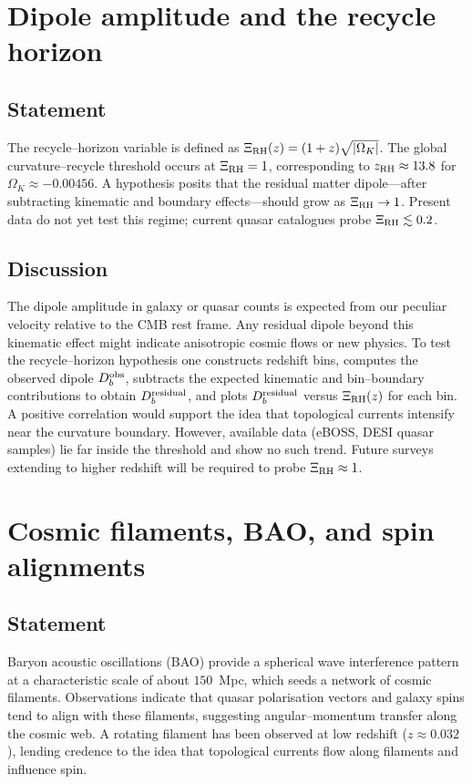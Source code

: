 \documentclass{article}
\begin{document}
\section{Dipole amplitude and the recycle horizon}
\label{sec:dipole}
\subsection{Statement}
The recycle–horizon variable is defined as $\Xi_{\rm RH}(z) = (1+z)\sqrt{|\Omega_K|}$.  The global curvature–recycle threshold occurs at $\Xi_{\rm RH}=1$, corresponding to $z_{\rm RH} \approx 13.8$ for $\Omega_K \approx -0.00456$.  A hypothesis posits that the residual matter dipole—after subtracting kinematic and boundary effects—should grow as $\Xi_{\rm RH} \to 1$.  Present data do not yet test this regime; current quasar catalogues probe $\Xi_{\rm RH} \lesssim 0.2$.

\subsection{Discussion}
The dipole amplitude in galaxy or quasar counts is expected from our peculiar velocity relative to the CMB rest frame.  Any residual dipole beyond this kinematic effect might indicate anisotropic cosmic flows or new physics.  To test the recycle–horizon hypothesis one constructs redshift bins, computes the observed dipole $D^{\rm obs}_b$, subtracts the expected kinematic and bin–boundary contributions to obtain $D^{\rm residual}_b$, and plots $D^{\rm residual}_b$ versus $\Xi_{\rm RH}(z)$ for each bin.  A positive correlation would support the idea that topological currents intensify near the curvature boundary.  However, available data (eBOSS, DESI quasar samples) lie far inside the threshold and show no such trend.  Future surveys extending to higher redshift will be required to probe $\Xi_{\rm RH}\approx1$.

\section{Cosmic filaments, BAO, and spin alignments}
\label{sec:filaments}
\subsection{Statement}
Baryon acoustic oscillations (BAO) provide a spherical wave interference pattern at a characteristic scale of about $150$~Mpc, which seeds a network of cosmic filaments.  Observations indicate that quasar polarisation vectors and galaxy spins tend to align with these filaments, suggesting angular–momentum transfer along the cosmic web.  A rotating filament has been observed at low redshift ($z\approx0.032$), lending credence to the idea that topological currents flow along filaments and influence spin.
\end{document}

